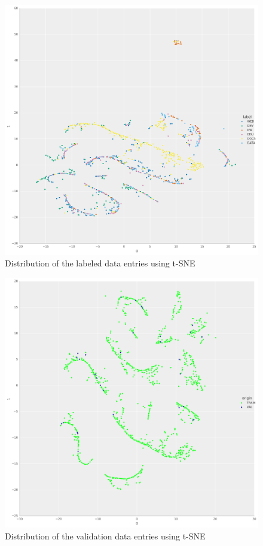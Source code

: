 \begin{figure}[h]
	\centering
		\includegraphics[width=18cm]{graphics/t-sne-training-data.png}
	\caption{Distribution of the labeled data entries using t-SNE}
	\label{t-sne-training-data}
\end{figure}


\begin{figure}[h]
	\centering
		\includegraphics[width=18cm]{graphics/t-sne-validation-data.png}
	\caption{Distribution of the validation data entries using t-SNE}
	\label{t-sne-validation-data}
\end{figure}


